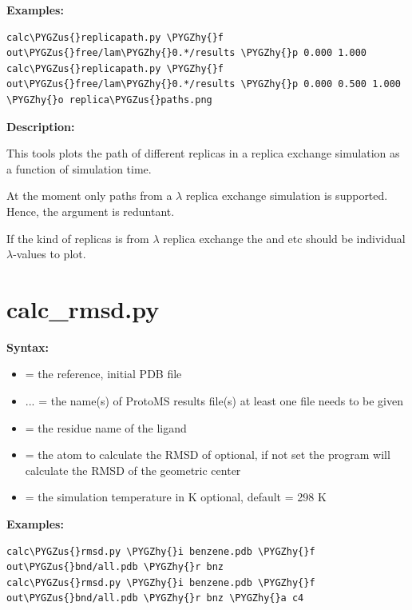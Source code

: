 \documentclass[letterpaper,10pt,english]{sphinxmanual}
\def\PYGZus{\char`\_}
\def\PYGZhy{\char`\-}
\begin{document}
\textbf{Examples:}

\begin{Verbatim}[commandchars=\\\{\}]
calc\PYGZus{}replicapath.py \PYGZhy{}f out\PYGZus{}free/lam\PYGZhy{}0.*/results \PYGZhy{}p 0.000 1.000
calc\PYGZus{}replicapath.py \PYGZhy{}f out\PYGZus{}free/lam\PYGZhy{}0.*/results \PYGZhy{}p 0.000 0.500 1.000 \PYGZhy{}o replica\PYGZus{}paths.png
\end{Verbatim}

\textbf{Description:}

This tools plots the path of different replicas in a replica exchange simulation as a function of simulation time.

At the moment only paths from a \(\lambda\) replica exchange simulation is supported. Hence, the  argument is reduntant.

If the kind of replicas is from \(\lambda\) replica exchange the  and  etc should be individual \(\lambda\)-values to plot.


\section{calc\_rmsd.py}
\label{tools:calc-rmsd-py}
\textbf{Syntax:}

\begin{itemize}
\item {} 
 = the reference, initial PDB file

\item {} 
 ... = the name(s) of ProtoMS results file(s)
at least one file needs to be given

\item {} 
 = the residue name of the ligand

\item {} 
 = the atom to calculate the RMSD of
optional, if not set the program will calculate the RMSD of the geometric center

\item {} 
 = the simulation temperature in K
optional, default = 298 K

\end{itemize}

\textbf{Examples:}

\begin{Verbatim}[commandchars=\\\{\}]
calc\PYGZus{}rmsd.py \PYGZhy{}i benzene.pdb \PYGZhy{}f out\PYGZus{}bnd/all.pdb \PYGZhy{}r bnz
calc\PYGZus{}rmsd.py \PYGZhy{}i benzene.pdb \PYGZhy{}f out\PYGZus{}bnd/all.pdb \PYGZhy{}r bnz \PYGZhy{}a c4
\end{Verbatim}
\end{document}
